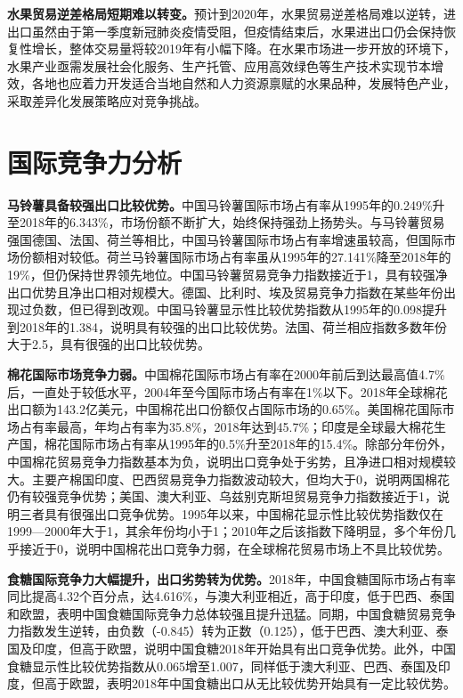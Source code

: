 \documentclass{progbookcn}
\begin{document}
\textbf{水果贸易逆差格局短期难以转变。}预计到2020年，水果贸易逆差格局难以逆转，进出口虽然由于第一季度新冠肺炎疫情受阻，但疫情结束后，水果进出口仍会保持恢复性增长，整体交易量将较2019年有小幅下降。在水果市场进一步开放的环境下，水果产业亟需发展社会化服务、生产托管、应用高效绿色等生产技术实现节本增效，各地也应着力开发适合当地自然和人力资源禀赋的水果品种，发展特色产业，采取差异化发展策略应对竞争挑战。

\section{国际竞争力分析}
\textbf{马铃薯具备较强出口比较优势。}中国马铃薯国际市场占有率从1995年的0.249\%升至2018年的6.343\%，市场份额不断扩大，始终保持强劲上扬势头。与马铃薯贸易强国德国、法国、荷兰等相比，中国马铃薯国际市场占有率增速虽较高，但国际市场份额相对较低。荷兰马铃薯国际市场占有率虽从1995年的27.141\%降至2018年的19\%，但仍保持世界领先地位。中国马铃薯贸易竞争力指数接近于1，具有较强净出口优势且净出口相对规模大。德国、比利时、埃及贸易竞争力指数在某些年份出现过负数，但已得到改观。中国马铃薯显示性比较优势指数从1995年的0.098提升到2018年的1.384，说明具有较强的出口比较优势。法国、荷兰相应指数多数年份大于2.5，具有很强的出口比较优势。

\textbf{棉花国际市场竞争力弱。}中国棉花国际市场占有率在2000年前后到达最高值4.7\%后，一直处于较低水平，2004年至今国际市场占有率在1\%以下。2018年全球棉花出口额为143.2亿美元，中国棉花出口份额仅占国际市场的0.65\%。美国棉花国际市场占有率最高，年均占有率为35.8\%，2018年达到45.7\%；印度是全球最大棉花生产国，棉花国际市场占有率从1995年的0.5\%升至2018年的15.4\%。除部分年份外，中国棉花贸易竞争力指数基本为负，说明出口竞争处于劣势，且净进口相对规模较大。主要产棉国印度、巴西贸易竞争力指数波动较大，但均大于0，说明两国棉花仍有较强竞争优势；美国、澳大利亚、乌兹别克斯坦贸易竞争力指数接近于1，说明三者具有很强出口竞争优势。1995年以来，中国棉花显示性比较优势指数仅在1999—2000年大于1，其余年份均小于1；2010年之后该指数下降明显，多个年份几乎接近于0，说明中国棉花出口竞争力弱，在全球棉花贸易市场上不具比较优势。

\textbf{食糖国际竞争力大幅提升，出口劣势转为优势。}2018年，中国食糖国际市场占有率同比提高4.32个百分点，达4.616\%，与澳大利亚相近，高于印度，低于巴西、泰国和欧盟，表明中国食糖国际竞争力总体较强且提升迅猛。同期，中国食糖贸易竞争力指数发生逆转，由负数（-0.845）转为正数（0.125），低于巴西、澳大利亚、泰国及印度，但高于欧盟，说明中国食糖2018年开始具有出口竞争优势。此外，中国食糖显示性比较优势指数从0.065增至1.007，同样低于澳大利亚、巴西、泰国及印度，但高于欧盟，表明2018年中国食糖出口从无比较优势开始具有一定比较优势。
\end{document}

